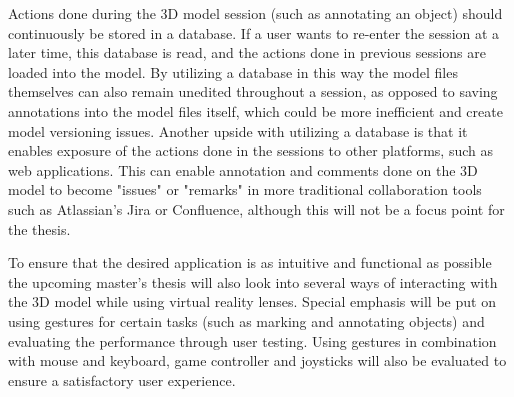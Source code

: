 Actions done during the 3D model session (such as annotating an object) should continuously be stored in a database. 
If a user wants to re-enter the session at a later time, this database is read, and the actions done in previous sessions are loaded into the model.
By utilizing a database 
in this way the model files themselves can also remain unedited throughout a session, as opposed to saving annotations into the model files itself, 
which could be more inefficient and create model versioning issues. 
Another upside with utilizing a database is that it enables exposure of the actions done in the sessions to other platforms, such as web applications. 
This can enable annotation and comments done on the 3D model to become "issues" or "remarks" in more traditional collaboration tools such as Atlassian's Jira or Confluence, 
although this will not be a focus point for the thesis.  

To ensure that the desired application is as intuitive and functional as possible the upcoming master's thesis will also look into several ways of interacting with the 
3D model while using virtual reality lenses. Special emphasis will be put on using gestures for certain tasks (such as marking and annotating objects) and evaluating the
performance through user testing. Using gestures in combination with mouse and keyboard, 
game controller and joysticks will also be evaluated to ensure a satisfactory user experience.     

